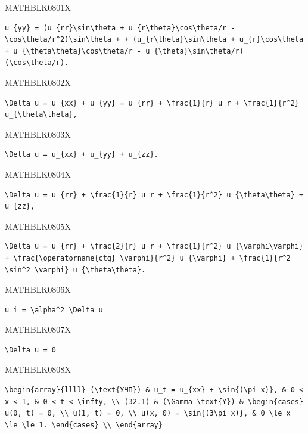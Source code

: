 \documentclass[
  ukrainian,
]{article}
\begin{document}
MATHBLK0801X

\begin{verbatim}
u_{yy} = (u_{rr}\sin\theta + u_{r\theta}\cos\theta/r - \cos\theta/r^2)\sin\theta + + (u_{r\theta}\sin\theta + u_{r}\cos\theta + u_{\theta\theta}\cos\theta/r - u_{\theta}\sin\theta/r)(\cos\theta/r).
\end{verbatim}

MATHBLK0802X

\begin{verbatim}
\Delta u = u_{xx} + u_{yy} = u_{rr} + \frac{1}{r} u_r + \frac{1}{r^2} u_{\theta\theta},
\end{verbatim}

MATHBLK0803X

\begin{verbatim}
\Delta u = u_{xx} + u_{yy} + u_{zz}.
\end{verbatim}

MATHBLK0804X

\begin{verbatim}
\Delta u = u_{rr} + \frac{1}{r} u_r + \frac{1}{r^2} u_{\theta\theta} + u_{zz},
\end{verbatim}

MATHBLK0805X

\begin{verbatim}
\Delta u = u_{rr} + \frac{2}{r} u_r + \frac{1}{r^2} u_{\varphi\varphi} + \frac{\operatorname{ctg} \varphi}{r^2} u_{\varphi} + \frac{1}{r^2 \sin^2 \varphi} u_{\theta\theta}.
\end{verbatim}

MATHBLK0806X

\begin{verbatim}
u_i = \alpha^2 \Delta u
\end{verbatim}

MATHBLK0807X

\begin{verbatim}
\Delta u = 0
\end{verbatim}

MATHBLK0808X

\begin{verbatim}
\begin{array}{llll} (\text{УЧП}) & u_t = u_{xx} + \sin{(\pi x)}, & 0 < x < 1, & 0 < t < \infty, \\ (32.1) & (\Gamma \text{Y}) & \begin{cases} u(0, t) = 0, \\ u(1, t) = 0, \\ u(x, 0) = \sin{(3\pi x)}, & 0 \le x \le \le 1. \end{cases} \\ \end{array}
\end{verbatim}
\end{document}
